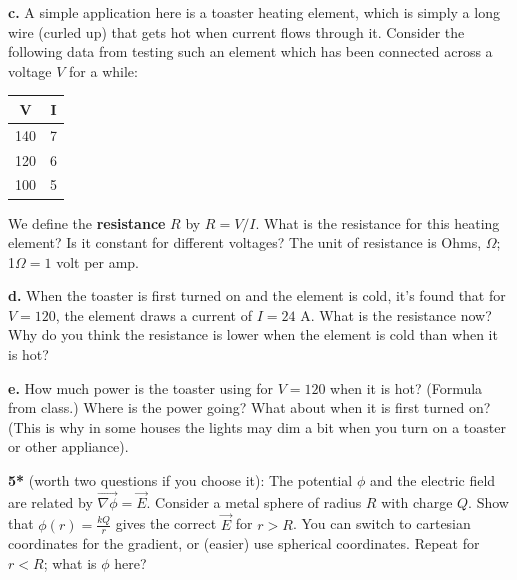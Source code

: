\documentclass[12pt]{article}
\begin{document}
\textbf{c.} A simple application here is a toaster heating element, which is simply a long wire (curled up) that gets hot when current flows through it. Consider the following data from testing such an element which has been connected across a voltage $V$ for a while:

\begin{table}[h]
    \centering
    \begin{tabular}{c|c}
         V& I\\
         \hline
         140& 7\\
         120 & 6\\
         100 & 5\\
    \end{tabular}
\end{table}

We define the \textbf{resistance} $R$ by $R=V/I$. What is the resistance for this heating element? Is it constant for different voltages? The unit of resistance is Ohms, $\Omega$; 1$\Omega=1$ volt per amp.

\textbf{d.} When the toaster is first turned on and the element is cold, it's found that for $V=120$, the element draws a current of $I=24$ A. What is the resistance now? Why do you think the resistance is lower when the element is cold than when it is hot? 

\textbf{e.} How much power is the toaster using for $V=120$ when it is hot? (Formula from class.) Where is the power going?  What about when it is first turned on? (This is why in some houses the lights may dim a bit when you turn on a toaster or other appliance). 

\bigskip

\textbf{5*} (worth two questions if you choose it): The potential $\phi$ and the electric field are related by $\vec{\nabla \phi} = \vec{E}$. Consider a metal sphere of radius $R$ with charge $Q$. Show that $\phi(r)=\frac{kQ}{r}$ gives the correct $\vec{E}$ for $r>R$. You can switch to cartesian coordinates for the gradient, or (easier) use spherical coordinates. Repeat for $r<R$; what is $\phi$ here?

  
\end{document}
